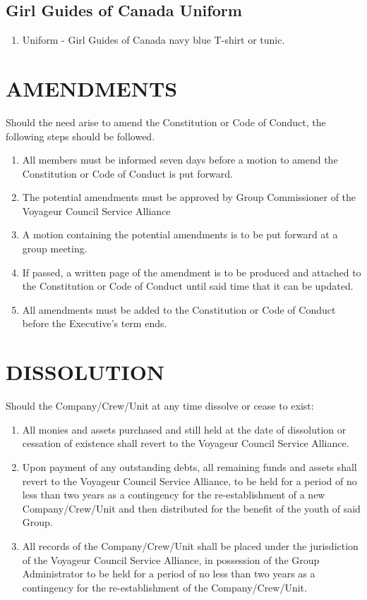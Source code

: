 \documentclass{Service_Corps_Document}
\begin{document}
    \subsection{Girl Guides of Canada Uniform}
    \begin{enumerate}
	    \item Uniform - Girl Guides of Canada navy blue T-shirt or tunic.
    \end{enumerate}


    \section{AMENDMENTS}\label{sec:amendments}
    Should the need arise to amend the Constitution or Code of Conduct, the following steps should be followed.
    \begin{enumerate}
        \item All members must be informed seven days before a motion to amend the Constitution or Code of Conduct is put forward.
        \item The potential amendments must be approved by Group Commissioner of the Voyageur Council Service Alliance
        \item A motion containing the potential amendments is to be put forward at a group meeting.
        \item If passed, a written page of the amendment is to be produced and attached to the Constitution or Code of Conduct until said time that it can be updated.
        \item All amendments must be added to the Constitution or Code of Conduct before the Executive's term ends.
    \end{enumerate}


    \section{DISSOLUTION}\label{sec:dissolution}
    Should the Company/Crew/Unit at any time dissolve or cease to exist:
    \begin{enumerate}
        \item All monies and assets purchased and still held at the date of dissolution or cessation of existence shall revert to the Voyageur Council Service Alliance.
        \item Upon payment of any outstanding debts, all remaining funds and assets shall revert to the Voyageur Council Service Alliance, to be held for a period of no less than two years as a contingency for the re-establishment of a new Company/Crew/Unit and then distributed for the benefit of the youth of said Group.
        \item All records of the Company/Crew/Unit shall be placed under the jurisdiction of the Voyageur Council Service Alliance, in possession of the Group Administrator to be held for a period of no less than two years as a contingency for the re-establishment of the Company/Crew/Unit.
    \end{enumerate}
\end{document}

